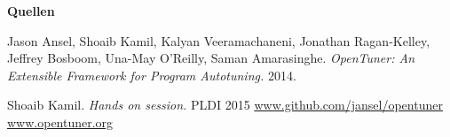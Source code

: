 \begin{frame}

  \textbf{Quellen}
      
  \begin{thebibliography}{9}

   
   
   Jason Ansel, Shoaib Kamil, Kalyan Veeramachaneni, Jonathan Ragan-Kelley, Jeffrey Bosboom, Una-May O'Reilly, Saman Amarasinghe. \emph{OpenTuner: An Extensible Framework for Program Autotuning.}
    2014.
    
  
   Shoaib Kamil. \emph{Hands on session.} PLDI 2015
   \url{www.github.com/jansel/opentuner}
   \url{www.opentuner.org}

  \end{thebibliography}

\end{frame}
\endgroup


